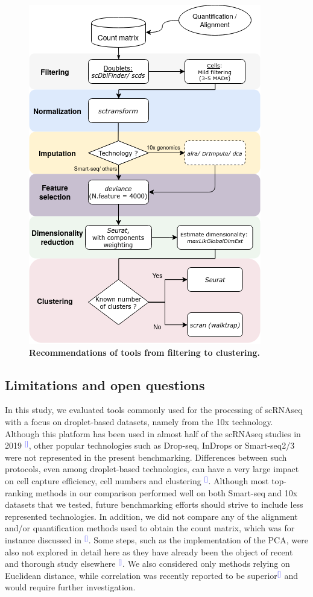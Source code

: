 \documentclass[11pt]{article}
\renewcommand{\cite}[1]{\textcolor{Blue}{$^[$\supercite{#1}$^]$}}
\begin{document}
\begin{figure}[h]
    \centering
    \includegraphics[scale=0.75,keepaspectratio]{main_figures/pipeComp_summary.png}
    \caption{\textbf{Recommendations of tools from filtering to clustering.}}
    \label{fig:figure11}
\end{figure}


\subsection*{Limitations and open questions}

In this study, we evaluated tools commonly used for the processing of scRNAseq with a focus on droplet-based datasets, namely from the 10x technology. Although this platform has been used in almost half of the scRNAseq studies in 2019 \cite{SvenssonDB2019}, other popular technologies such as Drop-seq, InDrops or Smart-seq2/3 were not represented in the present benchmarking. Differences between such protocols, even among droplet-based technologies, can have a very large impact on cell capture efficiency, cell numbers and clustering \cite{MereuCellAtlas2019, ZhangDroplet2019, SalomonDroplet2019}. Although most top-ranking methods in our comparison performed well on both Smart-seq and 10x datasets that we tested, future benchmarking efforts should strive to include less represented technologies. In addition, we did not compare any of the alignment and/or quantification methods used to obtain the count matrix, which was for instance discussed in \cite{viethSystematic2019}. Some steps, such as the implementation of the PCA, were also not explored in detail here as they have already been the object of recent and thorough study elsewhere \cite{SunDimRed2019, TsuyuzakiPCA2020}. We also considered only methods relying on Euclidean distance, while correlation was recently reported to be superior\cite{kim_impact_2019} and would require further investigation.
\end{document}
